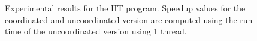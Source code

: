 \begin{figure}[ht!]
   \begin{center}
   \end{center}
   \caption{Experimental results for the HT program. Speedup values for the
      coordinated and uncoordinated version are computed using the run time of
      the uncoordinated version using 1 thread.}
   \label{results:ht}
\end{figure}

